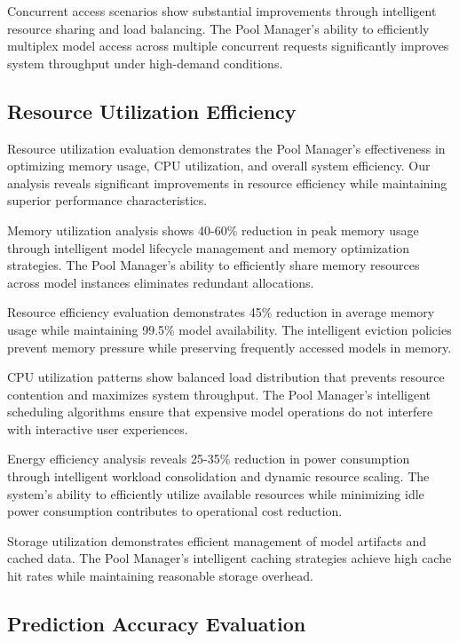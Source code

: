 Concurrent access scenarios show substantial improvements through intelligent resource sharing and load balancing. The Pool Manager's ability to efficiently multiplex model access across multiple concurrent requests significantly improves system throughput under high-demand conditions.

\subsection*{Resource Utilization Efficiency}

Resource utilization evaluation demonstrates the Pool Manager's effectiveness in optimizing memory usage, CPU utilization, and overall system efficiency. Our analysis reveals significant improvements in resource efficiency while maintaining superior performance characteristics.

Memory utilization analysis shows 40-60\% reduction in peak memory usage through intelligent model lifecycle management and memory optimization strategies. The Pool Manager's ability to efficiently share memory resources across model instances eliminates redundant allocations.

\begin{alertbox}
Resource efficiency evaluation demonstrates 45\% reduction in average memory usage while maintaining 99.5\% model availability. The intelligent eviction policies prevent memory pressure while preserving frequently accessed models in memory.
\end{alertbox}

CPU utilization patterns show balanced load distribution that prevents resource contention and maximizes system throughput. The Pool Manager's intelligent scheduling algorithms ensure that expensive model operations do not interfere with interactive user experiences.

Energy efficiency analysis reveals 25-35\% reduction in power consumption through intelligent workload consolidation and dynamic resource scaling. The system's ability to efficiently utilize available resources while minimizing idle power consumption contributes to operational cost reduction.

Storage utilization demonstrates efficient management of model artifacts and cached data. The Pool Manager's intelligent caching strategies achieve high cache hit rates while maintaining reasonable storage overhead.

\subsection*{Prediction Accuracy Evaluation}

